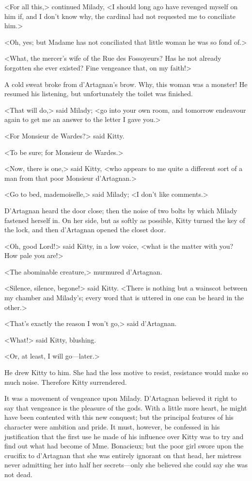 <For all this,> continued Milady, <I should long ago have revenged myself on him if, and I don't know why, the cardinal had not requested me to conciliate him.> 

<Oh, yes; but Madame has not conciliated that little woman he was so fond of.> 

<What, the mercer's wife of the Rue des Fossoyeurs? Has he not already forgotten she ever existed? Fine vengeance that, on my faith!> 

A cold sweat broke from d'Artagnan's brow. Why, this woman was a monster! He resumed his listening, but unfortunately the toilet was finished. 

<That will do,> said Milady; <go into your own room, and tomorrow endeavour again to get me an answer to the letter I gave you.> 

<For Monsieur de Wardes?> said Kitty. 

<To be sure; for Monsieur de Wardes.> 

<Now, there is one,> said Kitty, <who appears to me quite a different sort of a man from that poor Monsieur d'Artagnan.> 

<Go to bed, mademoiselle,> said Milady; <I don't like comments.> 

D'Artagnan heard the door close; then the noise of two bolts by which Milady fastened herself in. On her side, but as softly as possible, Kitty turned the key of the lock, and then d'Artagnan opened the closet door. 

<Oh, good Lord!> said Kitty, in a low voice, <what is the matter with you? How pale you are!> 

<The abominable creature,> murmured d'Artagnan. 

<Silence, silence, begone!> said Kitty. <There is nothing but a wainscot between my chamber and Milady's; every word that is uttered in one can be heard in the other.> 

<That's exactly the reason I won't go,> said d'Artagnan. 

<What!> said Kitty, blushing. 

<Or, at least, I will go---later.> 

He drew Kitty to him. She had the less motive to resist, resistance would make so much noise. Therefore Kitty surrendered. 

It was a movement of vengeance upon Milady. D'Artagnan believed it right to say that vengeance is the pleasure of the gods. With a little more heart, he might have been contented with this new conquest; but the principal features of his character were ambition and pride. It must, however, be confessed in his justification that the first use he made of his influence over Kitty was to try and find out what had become of Mme. Bonacieux; but the poor girl swore upon the crucifix to d'Artagnan that she was entirely ignorant on that head, her mistress never admitting her into half her secrets---only she believed she could say she was not dead. 

